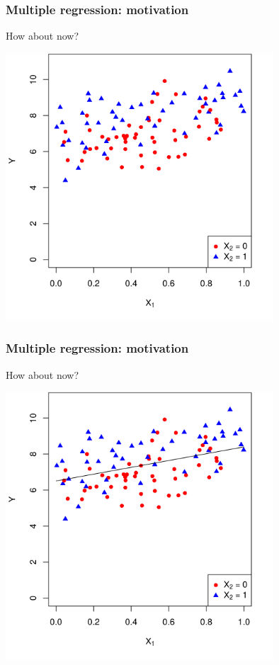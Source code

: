 \documentclass[12pt, 
hyperref={colorlinks=true, linkcolor=blue, urlcolor=cyan}]{beamer}
\begin{document}
\begin{frame}
\frametitle{Multiple regression: motivation}
How about now?

\centering
\includegraphics[width=0.75\textwidth]{plots/precision_colored.png}
\end{frame}

\begin{frame}
\frametitle{Multiple regression: motivation}
How about now?

\centering
\includegraphics[width=0.75\textwidth]{plots/precision_colored_with_line.png}
\end{frame}
\end{document}
